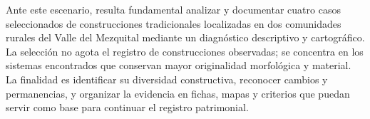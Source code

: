 
Ante este escenario, resulta fundamental analizar y documentar cuatro casos seleccionados de construcciones tradicionales localizadas en dos comunidades rurales del Valle del Mezquital mediante un diagnóstico descriptivo y cartográfico. La selección no agota el registro de construcciones observadas; se concentra en los sistemas encontrados que conservan mayor originalidad morfológica y material. La finalidad es identificar su diversidad constructiva, reconocer cambios y permanencias, y organizar la evidencia en fichas, mapas y criterios que puedan servir como base para continuar el registro patrimonial.
